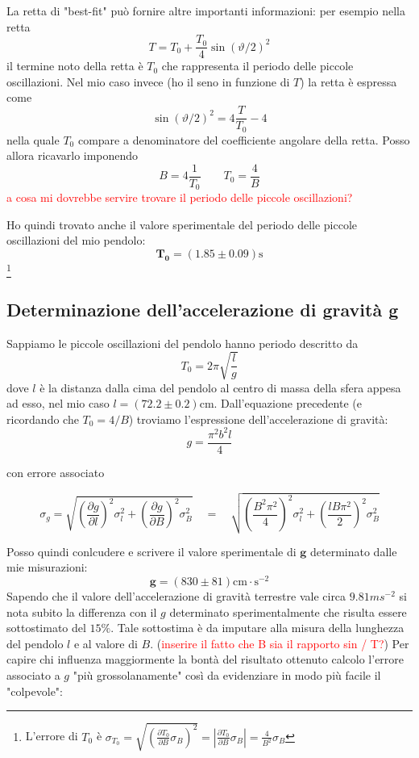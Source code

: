 \documentclass{article}
\begin{document}
\noindent
La retta di "best-fit" può fornire altre importanti informazioni: per esempio nella retta 
\[
T = T_0 + \frac{T_0}{4}\sin{\left(\vartheta/2\right)}^2
\]
il termine noto della retta è $T_0$ che rappresenta il periodo delle piccole oscillazioni. Nel mio caso invece (ho il seno in funzione di $T$) la retta è espressa come
\[
\sin{\left(\vartheta/2\right)}^2 = 4\frac{T}{T_0} - 4
\]
nella quale $T_0$ compare a denominatore del coefficiente angolare della retta. Posso allora ricavarlo imponendo
\[
B =  4\frac{1}{T_0} \qquad T_0 = \frac{4}{B} 
\]
\textcolor{red}{a cosa mi dovrebbe servire trovare il periodo delle piccole oscillazioni?}

\noindent
Ho quindi trovato anche il valore sperimentale del periodo delle piccole oscillazioni del mio pendolo:
\[
\mathbf{T_0} = (1.85 \pm 0.09)\text{s}
\]
\footnote{L'errore di $T_0$ è $\sigma_{T_0} = \sqrt{\left(\frac{\partial T_0}{\partial B}\sigma_{B}\right)^2} = \left|\frac{\partial T_0}{\partial B}\sigma_{B}\right| = \frac{4}{B^2}\sigma_B$}

\subsection{Determinazione dell'accelerazione di gravità g}
Sappiamo le piccole oscillazioni del pendolo hanno periodo descritto da
\[
T_0 = 2\pi \sqrt{\frac{l}{g}} 
\]
dove $l$ è la distanza dalla cima del pendolo al centro di massa della sfera appesa ad esso, nel mio caso $l = (72.2 \pm 0.2)$cm. Dall'equazione precedente (e ricordando che $T_0 = 4/B$) troviamo l'espressione dell'accelerazione di gravità:
\[
g = \frac{\pi^2b^2l}{4}
\]

con errore associato

\[
\sigma_g = \sqrt{\left(\frac{\partial g}{\partial l} \right)^2\sigma_l^2 + \left(\frac{\partial g}{\partial B} \right)^2 \sigma_B^2}  \quad = \quad 	\sqrt{\left(\frac{B^2\pi^2}{4}\right)^2 \sigma_l^2 + \left( \frac{lB\pi^2}{2}  \right)^2 \sigma_B^2}	 
\]


\noindent
Posso quindi conlcudere e scrivere il valore sperimentale di $\mathbf{g}$ determinato dalle mie misurazioni:
\[
\mathbf{g} = (830 \pm 81)\text{cm}\cdot \text{s}^{-2}
\]
\noindent
Sapendo che il valore dell'accelerazione di gravità terrestre vale circa $9.81ms^{-2}$ si nota subito la differenza con il $g$ determinato sperimentalmente che risulta essere sottostimato del $15\%$. Tale sottostima è da imputare alla misura della lunghezza del pendolo $l$ e al valore di $B$. (\textcolor{red}{inserire il fatto che B sia il rapporto sin / T?}) Per capire chi influenza maggiormente la bontà del risultato ottenuto calcolo l'errore associato a $g$ "più grossolanamente" così da evidenziare in modo più facile il "colpevole":
\end{document}
